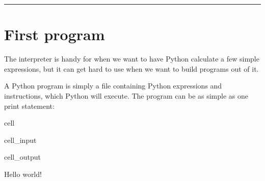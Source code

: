 \documentclass[letterpaper,10pt,english]{jupyterBook}
\begin{document}
\bigskip\hrule\bigskip


\sphinxstepscope


\chapter{First program}
\label{\detokenize{first-program:first-program}}\label{\detokenize{first-program::doc}}
\sphinxAtStartPar
The interpreter is handy for when we want to have Python calculate a few simple expressions, but it can get hard to use when we want to build programs out of it.

\sphinxAtStartPar
A Python program is simply a file containing Python expressions and instructions, which Python will execute.
The program can be as simple as one print statement:

\begin{sphinxuseclass}{cell}\begin{sphinxVerbatimInput}

\begin{sphinxuseclass}{cell_input}
\begin{sphinxVerbatim}[commandchars=\\\{\}]
\end{sphinxVerbatim}

\end{sphinxuseclass}\end{sphinxVerbatimInput}
\begin{sphinxVerbatimOutput}

\begin{sphinxuseclass}{cell_output}
\begin{sphinxVerbatim}[commandchars=\\\{\}]
Hello world!
\end{sphinxVerbatim}

\end{sphinxuseclass}\end{sphinxVerbatimOutput}

\end{sphinxuseclass}
\end{document}
